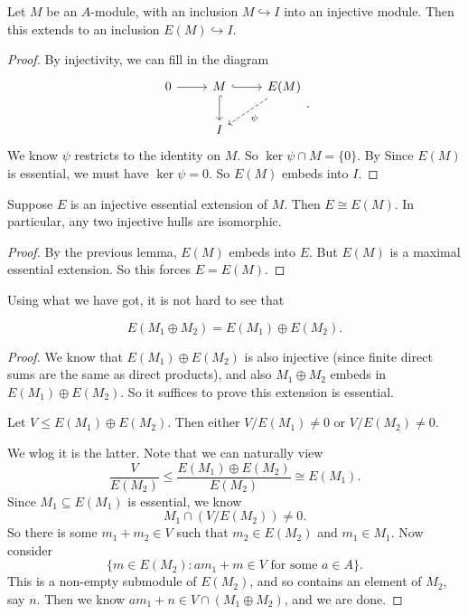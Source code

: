 \documentclass[a4paper]{article}
\begin{document}
\begin{prop}
  Let $M$ be an $A$-module, with an inclusion $M \hookrightarrow I$ into an injective module. Then this extends to an inclusion $E(M) \hookrightarrow I$.
\end{prop}

\begin{proof}
  By injectivity, we can fill in the diagram
  \[
    \begin{tikzcd}
      0 \ar[r] & M \ar[r, hook] \ar[d, hook] & E(M) \ar[dl, "\psi", dashed]\\
      & I
    \end{tikzcd}.
  \]
  We know $\psi$ restricts to the identity on $M$. So $\ker \psi \cap M = \{0\}$. By Since $E(M)$ is essential, we must have $\ker \psi = 0$. So $E(M)$ embeds into $I$.
\end{proof}

\begin{prop}
  Suppose $E$ is an injective essential extension of $M$. Then $E \cong E(M)$. In particular, any two injective hulls are isomorphic.
\end{prop}

\begin{proof}
  By the previous lemma, $E(M)$ embeds into $E$. But $E(M)$ is a maximal essential extension. So this forces $E = E(M)$.
\end{proof}

Using what we have got, it is not hard to see that
\begin{prop}
  \[
    E(M_1 \oplus M_2) = E(M_1) \oplus E(M_2).
  \]
\end{prop}

\begin{proof}
  We know that $E(M_1) \oplus E(M_2)$ is also injective (since finite direct sums are the same as direct products), and also $M_1 \oplus M_2$ embeds in $E(M_1) \oplus E(M_2)$. So it suffices to prove this extension is essential.

  Let $V \leq E(M_1) \oplus E(M_2)$. Then either $V/E(M_1) \not= 0$ or $V/E(M_2) \not= 0$.

  We wlog it is the latter. Note that we can naturally view
  \[
    \frac{V}{E(M_2)} \leq \frac{E(M_1) \oplus E(M_2)}{E(M_2)} \cong E(M_1).
  \]
  Since $M_1 \subseteq E(M_1)$ is essential, we know
  \[
    M_1 \cap (V/E(M_2)) \not= 0.
  \]
  So there is some $m_1 + m_2 \in V$ such that $m_2 \in E(M_2)$ and $m_1 \in M_1$. Now consider
  \[
    \{m \in E(M_2): am_1 + m \in V\text{ for some }a \in A\}.
  \]
  This is a non-empty submodule of $E(M_2)$, and so contains an element of $M_2$, say $n$. Then we know $am_1 + n \in V \cap (M_1 \oplus M_2)$, and we are done.
\end{proof}
\end{document}
